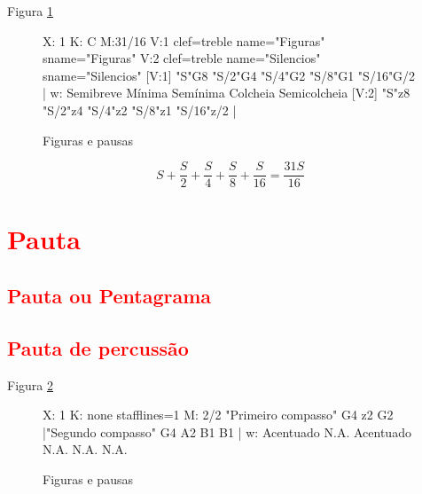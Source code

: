 Figura \ref{fig:abc-figuraspausas}
\begin{figure}[H]
\centering
\begin{abc}[name=abc-figuraspausas]
%
X: 1 %
K: C %
M:31/16
V:1 clef=treble name="Figuras"   sname="Figuras"
V:2 clef=treble name="Silencios" sname="Silencios"
%
[V:1] "S"G8  "S/2"G4  "S/4"G2  "S/8"G1 "S/16"G/2           |
w:    Semibreve Mínima Semínima Colcheia Semicolcheia        
%
[V:2] "S"z8 "S/2"z4 "S/4"z2  "S/8"z1  "S/16"z/2   |
%       
\end{abc}
\caption{Figuras e pausas}
\label{fig:abc-figuraspausas}
\end{figure}

\begin{equation}
S+\frac{S}{2}+\frac{S}{4}+\frac{S}{8}+\frac{S}{16} =\frac{31S}{16}
\end{equation}



\section{\textcolor{red}{Pauta}}

\subsection{\textcolor{red}{Pauta ou Pentagrama}}
\subsection{\textcolor{red}{Pauta de percussão}}


Figura \ref{fig:abc-monolinearperc}
\begin{figure}[H]
\centering
\begin{abc}[name=abc-monolinearperc]
%
X: 1 %
K: none stafflines=1 %
M: 2/2 %
"Primeiro compasso"  G4 z2 G2 |"Segundo compasso" G4 A2 B1 B1  |
w:  Acentuado   N.A. Acentuado N.A. N.A. N.A.
\end{abc}
\caption{Figuras e pausas}
\label{fig:abc-monolinearperc}
\end{figure}





